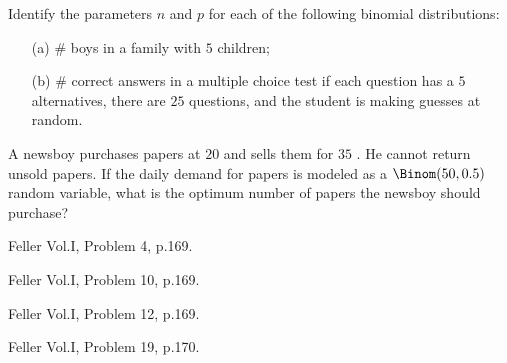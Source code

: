 \begin{problem}[Handout 8, \# 2]
  Identify the parameters \(n\) and \(p\) for each of the following
  binomial distributions:
  \begin{itemize}
  \item[(a)] \(\#\) boys in a family with \(5\) children;
  \item[(b)] \(\#\) correct answers in a multiple choice test if each
    question has a \(5\) alternatives, there are \(25\) questions, and the
    student is making guesses at random.
  \end{itemize}
\end{problem}
\begin{solution}

\end{solution}
\newpage

\begin{problem}[Handout 8, \# 10]
  A newsboy purchases papers at \(20\) \textcent{} and sells them for \(35\)
  \textcent{}. He cannot return unsold papers. If the daily demand for papers
  is modeled as a \(\Binom(50,0.5)\) random variable, what is the optimum
  number of papers the newsboy should purchase?
\end{problem}
\begin{solution}

\end{solution}
\newpage

\begin{problem}[Handout 8, \# 12]
  Feller Vol.\@ I, Problem 4, p.\@ 169.
\end{problem}
\begin{solution}

\end{solution}
\newpage

\begin{problem}[Handout 8, \# 13]
  Feller Vol.\@ I, Problem 10, p.\@ 169.
\end{problem}
\begin{solution}

\end{solution}
\newpage

\begin{problem}[Handout 8, \# 14]
  Feller Vol.\@ I, Problem 12, p.\@ 169.
\end{problem}
\begin{solution}

\end{solution}
\newpage

\begin{problem}[Handout 8, \# 15]
  Feller Vol.\@ I, Problem 19, p.\@ 170.
\end{problem}
\begin{solution}

\end{solution}
\newpage

